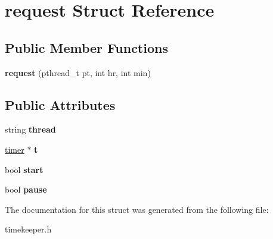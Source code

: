 \hypertarget{structrequest}{\section{request \-Struct \-Reference}
\label{structrequest}
}
\subsection*{\-Public \-Member \-Functions}
\begin{DoxyCompactItemize}
\item 
\hypertarget{structrequest_a3b5e5487ad82be0b7a776823f7986922}{{\bfseries request} (pthread\-\_\-t pt, int hr, int min)}\label{structrequest_a3b5e5487ad82be0b7a776823f7986922}

\end{DoxyCompactItemize}
\subsection*{\-Public \-Attributes}
\begin{DoxyCompactItemize}
\item 
\hypertarget{structrequest_a3f4408bdbf1b1c5cb7c5116be1b1f77a}{string {\bfseries thread}}\label{structrequest_a3f4408bdbf1b1c5cb7c5116be1b1f77a}

\item 
\hypertarget{structrequest_a10591c823c56250b39b90d8bdccdb548}{\hyperlink{classtimer}{timer} $\ast$ {\bfseries t}}\label{structrequest_a10591c823c56250b39b90d8bdccdb548}

\item 
\hypertarget{structrequest_ac8189d639e491a603111411045e8a518}{bool {\bfseries start}}\label{structrequest_ac8189d639e491a603111411045e8a518}

\item 
\hypertarget{structrequest_a7f5bc660b836e6863963adf89981c39a}{bool {\bfseries pause}}\label{structrequest_a7f5bc660b836e6863963adf89981c39a}

\end{DoxyCompactItemize}


\-The documentation for this struct was generated from the following file\-:\begin{DoxyCompactItemize}
\item 
timekeeper.\-h\end{DoxyCompactItemize}

